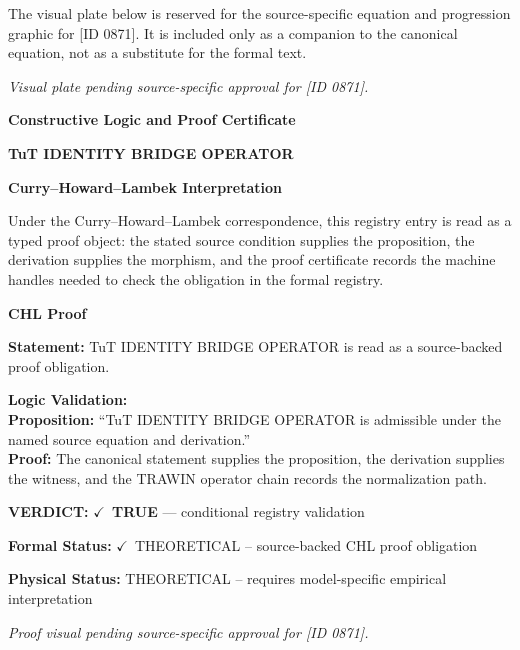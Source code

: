 \begingroup\footnotesize\sloppy
The visual plate below is reserved for the source-specific equation and progression graphic for [ID 0871]. It is included only as a companion to the canonical equation, not as a substitute for the formal text.
\par\endgroup
\begingroup\footnotesize\itshape
Visual plate pending source-specific approval for [ID 0871].
\par\endgroup

\clearpage
\begingroup\tzpsupportsetup
\noindent\textbf{\fontsize{10.8pt}{12.8pt}\selectfont [ID 0871] Constructive Logic and Proof Certificate}\par
\noindent\textbf{\fontsize{10pt}{12pt}\selectfont TuT IDENTITY BRIDGE OPERATOR}\par
\vspace{0.45em}
\begingroup
\footnotesize
\setlength{\parskip}{0.22em}
\setlength{\parindent}{0pt}
\noindent\textbf{Curry--Howard--Lambek Interpretation}\par
Under the Curry--Howard--Lambek correspondence, this registry entry is read as a typed proof
object: the stated source condition supplies the proposition, the derivation supplies the
morphism, and the proof certificate records the machine handles needed to check the obligation
in the formal registry.

\vspace{0.45em}
\noindent\textbf{CHL Proof}\par
\textbf{Statement:} TuT IDENTITY BRIDGE OPERATOR is read as a source-backed proof obligation.

\textbf{Logic Validation:}\\
\textbf{Proposition:} ``TuT IDENTITY BRIDGE OPERATOR is admissible under the named source equation and derivation.''\\
\textbf{Proof:} The canonical statement supplies the proposition, the derivation supplies the witness, and the TRAWIN operator chain records the normalization path.

\textbf{VERDICT:} \ensuremath{\checkmark}\ \textbf{TRUE} --- conditional registry validation

\textbf{Formal Status:} \ensuremath{\checkmark}\ THEORETICAL -- source-backed CHL proof obligation

\textbf{Physical Status:} THEORETICAL -- requires model-specific empirical interpretation
\par\vspace{0.45em}
\par
\vfill
\begingroup\footnotesize\itshape
Proof visual pending source-specific approval for [ID 0871].
\par\endgroup
\vfill
\endgroup
\endgroup
